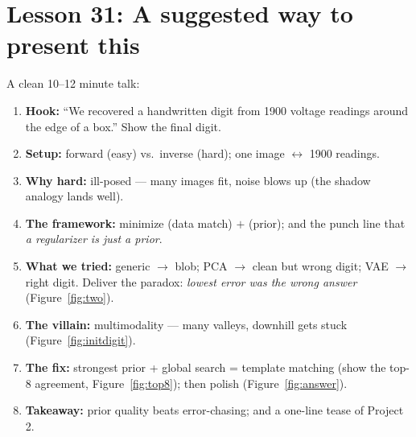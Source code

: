 \documentclass[11pt]{article}
\begin{document}
\section{Lesson 31: A suggested way to present this}

A clean 10--12 minute talk:
\begin{enumerate}[leftmargin=2em]
\item \textbf{Hook:} ``We recovered a handwritten digit from 1900 voltage
readings around the edge of a box.'' Show the final digit.
\item \textbf{Setup:} forward (easy) vs.\ inverse (hard); one image
$\leftrightarrow$ 1900 readings.
\item \textbf{Why hard:} ill-posed --- many images fit, noise blows up (the
shadow analogy lands well).
\item \textbf{The framework:} minimize (data match) $+$ (prior); and the punch
line that \emph{a regularizer is just a prior}.
\item \textbf{What we tried:} generic $\to$ blob; PCA $\to$ clean but wrong
digit; VAE $\to$ right digit. Deliver the paradox: \emph{lowest error was the
wrong answer} (Figure~\ref{fig:two}).
\item \textbf{The villain:} multimodality --- many valleys, downhill gets
stuck (Figure~\ref{fig:initdigit}).
\item \textbf{The fix:} strongest prior + global search = template matching
(show the top-8 agreement, Figure~\ref{fig:top8}); then polish
(Figure~\ref{fig:answer}).
\item \textbf{Takeaway:} prior quality beats error-chasing; and a one-line
tease of Project 2.
\end{enumerate}
\end{document}
